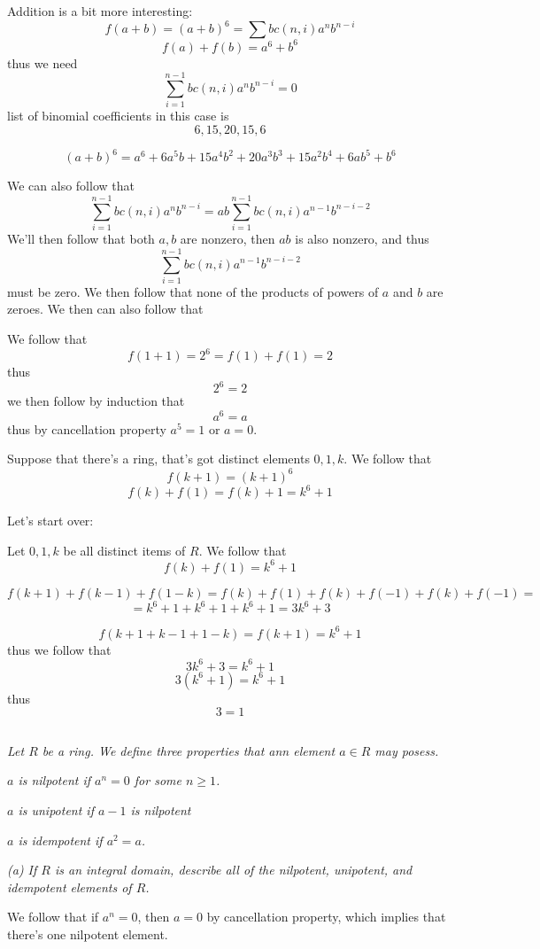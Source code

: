\documentclass[11pt,oneside,titlepage]{book}
\begin{document}
Addition is a bit more interesting:
$$f(a + b) = (a + b)^6 = \sum{bc(n, i)a^n b^{n - i}}$$
$$f(a) + f(b) = a^6 + b^6$$
thus we need
$$\sum_{i = 1}^{n - 1}{bc(n, i)a^n b^{n - i}} = 0$$
list of binomial coefficients in this case is
$$6, 15, 20, 15, 6$$

$$(a + b)^6 = a^6 + 6a^5b + 15a^4b^2 + 20a^3b^3 + 15a^2b^4 + 6ab^5 + b^6$$

We can also follow that
$$\sum_{i = 1}^{n - 1}{bc(n, i)a^n b^{n - i}} =
ab \sum_{i = 1}^{n - 1}{bc(n, i)a^{n - 1} b^{n - i - 2}}$$ We'll then
follow that both $a, b$ are nonzero, then $ab$ is also nonzero, and
thus
$$\sum_{i = 1}^{n - 1}{bc(n, i)a^{n - 1} b^{n - i - 2}}$$
must be zero. We then follow that none of the products of powers of
$a$ and $b$ are zeroes. We then can also follow that

We follow that
$$f(1 + 1) = 2^6 = f(1) + f(1) = 2$$
thus
$$2^6 = 2$$
we then follow by induction that
$$a^6 = a$$
thus by cancellation property $a^5 = 1$ or $a = 0$.

Suppose that there's a ring, that's got distinct elements $0, 1,
k$. We follow that
$$f(k + 1) = (k + 1)^6$$
$$f(k) + f(1) = f(k) + 1 = k^6 + 1$$


Let's start over:

Let $0, 1, k$ be all distinct items of $R$. We follow that
$$f(k) + f(1) = k^6 + 1$$

$$f(k + 1) + f(k - 1) + f(1 - k) =
f(k) + f(1) + f(k) + f(-1) + f(k) + f(-1) = $$
$$ = k^6 + 1 + k^6 + 1 + k^6 + 1 = 3k^6 + 3$$

$$f(k + 1 + k - 1 + 1 - k) = f(k + 1) = k^6 + 1$$
thus we follow that
$$3k^6 + 3 = k^6 + 1$$
$$3(k^6 + 1) = k^6 + 1$$
thus
$$3 = 1$$


\subsection{}

\textit{Let $R$ be a ring. We define three properties that ann element
$a \in R$ may posess.}

\textit{$a$ is nilpotent if $a^n = 0$ for some $n \geq 1$.}

\textit{$a$ is unipotent if $a - 1$ is nilpotent}

\textit{$a$ is idempotent if $a^2 = a$.}

\textit{(a) If $R$ is an integral domain, describe all of the
nilpotent, unipotent, and idempotent elements of $R$.}

We follow that if $a^n = 0$, then $a = 0$ by cancellation property,
which implies that there's one nilpotent element.
\end{document}
